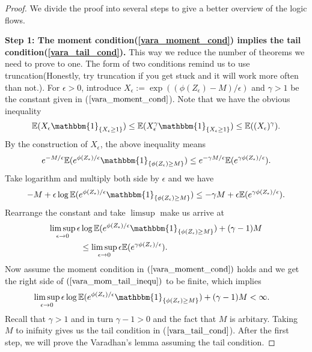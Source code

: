 \documentclass[10pt]{article}
\newcommand{\e}{\mathbb{E}}
\newenvironment{Proof of lemma}{\noindent{\bf Proof of Lemma}}{\hfill$\Box$\newline}
\newenvironment{Proof of claim}{\noindent{\bf Proof of claim}}{\hfill$\Box$\newline}
\newenvironment{Proof of theorem}{\noindent{\bf Proof of Theorem}}{\hfill\scriptsize{$\Box$}\newline}
\newenvironment{Proof of theorems}{\noindent{\bf Proof of Theorems}}{\hfill$\Box$\newline}
\newenvironment{Proof of proposition}{\noindent{\bf Proof of Proposition}}{\hfill$\Box$\newline}
\newenvironment{Proof of propositions}{\noindent{\bf Proof of Propositions}}{\hfill$\Box$\newline}
\newenvironment{Proof of exercise}{\noindent{\it Proof of Exercise:}}{\hfill$\Box$}
\numberwithin{equation}{section}
\begin{document}
\begin{proof}
    We divide the proof into several steps to give a better overview of the logic flows.

    \textbf{Step 1: The moment condition(\ref{vara_moment_cond}) implies the tail condition(\ref{vara_tail_cond}). }
    This way we reduce the number of theorems we need to prove to one. The form of two conditions remind us to use truncation(Honestly, try truncation if you get stuck and it will work more often than not.). For $\epsilon >0$, introduce $X_{\epsilon}:= \exp ((\phi(Z_{\epsilon})-M)/\epsilon)$ and $\gamma >1$ be the constant given in ($\ref{vara_moment_cond}$). Note that we have the obvious inequality
    \begin{align}
        \e(X_{\epsilon} \mathbbm{1}_{\{X_{\epsilon} \geq 1\}}) \leq \e(X_{\epsilon}^{\gamma} \mathbbm{1}_{\{X_{\epsilon} \geq 1\}}) \leq \e((X_{\epsilon})^{\gamma}).
    \end{align}
    By the construction of $X_{\epsilon}$, the above inequality means
    \begin{align}
        e^{-M/\epsilon} \e(e^{\phi(Z_{\epsilon})/\epsilon}\mathbbm{1}_{\{\phi(Z_{\epsilon}) \geq M\}}) \leq e^{-\gamma M/\epsilon} \e(e^{\gamma\phi(Z_{\epsilon})/\epsilon}).
    \end{align}
    Take logarithm and multiply both side by $\epsilon$ and we have
    \begin{align}
        -M + \epsilon \log \e(e^{\phi(Z_{\epsilon})/\epsilon}\mathbbm{1}_{\{\phi(Z_{\epsilon}) \geq M\}}) \leq -\gamma M + \epsilon \e(e^{\gamma\phi(Z_{\epsilon})/\epsilon}).
    \end{align}
    Rearrange the constant and take $\limsup$ make us arrive at
    \begin{align} \label{vara_mom_tail_inequ}
        \limsup_{\epsilon \to 0}  \epsilon &\log \e(e^{\phi(Z_{\epsilon})/\epsilon}\mathbbm{1}_{\{\phi(Z_{\epsilon}) \geq M\}}) + (\gamma - 1)M \nonumber \\
        &\leq  \limsup_{\epsilon \to 0} \epsilon \e(e^{\gamma\phi(Z_{\epsilon})/\epsilon}).
    \end{align}
    Now assume the moment condition in $(\ref{vara_moment_cond})$ holds and we get the right side of $(\ref{vara_mom_tail_inequ})$ to be finite, which implies
    \begin{align}
        \limsup_{\epsilon \to 0}  \epsilon &\log \e(e^{\phi(Z_{\epsilon})/\epsilon}\mathbbm{1}_{\{\phi(Z_{\epsilon}) \geq M\}}) + (\gamma - 1)M  < \infty.
    \end{align}
    Recall that $\gamma > 1$ and in turn $\gamma - 1 >0$ and the fact that $M$ is arbitary. Taking $M$ to inifnity gives us the tail condition in ($\ref{vara_tail_cond}$). After the first step, we will prove the Varadhan's lemma assuming the tail condition.


\end{proof}
\end{document}
